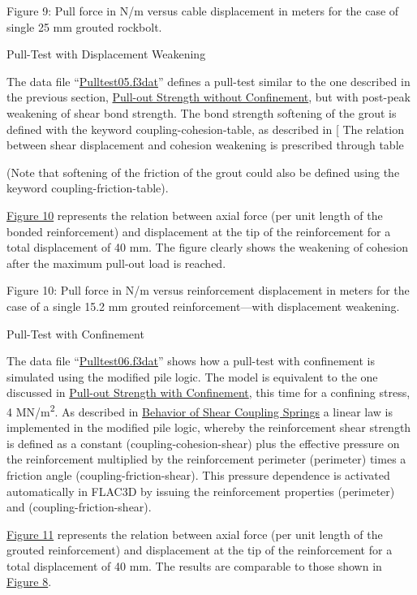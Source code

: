 \documentclass[a4paper, nobind]{templates/ociamthesis}
\begin{document}
Figure 9: Pull force in N/m versus cable displacement in meters
for the case of single 25 mm grouted rockbolt.

Pull-Test with Displacement
Weakening

The data file ``\protect\hyperlink{pulltest05data}{Pulltest05.f3dat}'' defines a pull-test
similar to the one described in the previous section, \protect\hyperlink{pulltest-pile1-section}{Pull-out
Strength without Confinement}, but with
post-peak weakening of shear
bond strength. The bond strength softening of the grout is defined with
the
keyword coupling-cohesion-table, as described in {[}
The relation between shear displacement and cohesion
weakening is prescribed through table

(Note that softening
of the friction of the grout could also be defined using the keyword
coupling-friction-table).

\protect\hyperlink{pulltest-pile2}{Figure 10} represents the relation between axial
force (per unit length of the bonded reinforcement) and displacement at
the tip
of the reinforcement for a total displacement of 40 mm. The figure
clearly shows
the weakening of cohesion after the maximum pull-out load is reached.

Figure 10: Pull force in N/m versus reinforcement displacement
in meters for the case of a single 15.2 mm grouted reinforcement---with
displacement weakening.

Pull-Test with Confinement

The data file ``\protect\hyperlink{pulltest06data}{Pulltest06.f3dat}'' shows how a
pull-test
with confinement is simulated using the modified pile logic. The model
is
equivalent to the one discussed in \protect\hyperlink{pulltest-cable2-section}{Pull-out Strength with
Confinement}, this time for a confining
stress, 4 MN/m\textsuperscript{2}. As
described in \href{../../../../sel/doc/manual/sel_manual/piles/piles.html\#pile-shear-coupling-springs}{Behavior
of Shear Coupling
Springs}
a linear law is implemented in the modified
pile logic, whereby the reinforcement shear strength is defined as a
constant
(coupling-cohesion-shear) plus the effective pressure
on the reinforcement multiplied by the reinforcement perimeter
(perimeter) times a friction angle (coupling-friction-shear). This
pressure dependence is
activated automatically in FLAC3D by issuing the
reinforcement properties (perimeter) and (coupling-friction-shear).

\protect\hyperlink{pulltest-pile3}{Figure 11} represents the relation between axial
force (per unit length of the grouted reinforcement) and displacement at
the tip
of the reinforcement for a total displacement of 40 mm. The results are
comparable to those shown in \protect\hyperlink{pulltest-cable3}{Figure 8}.
\end{document}
